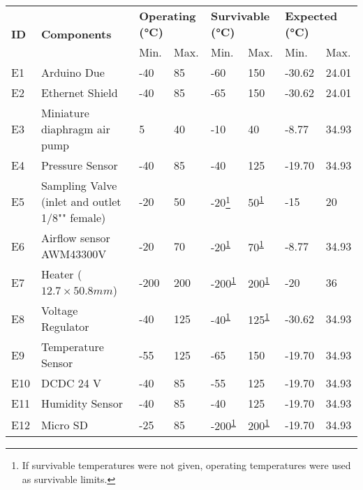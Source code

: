 



\begin{longtable}{|m{1cm}|m{3.5cm}|m{1.3cm}|m{1.3cm}|m{1.4cm}|m{1.3cm}|m{1.3cm}|m{1.3cm}|}
\hline
\multirow{2}{*}{\textbf{ID}} & \multirow{2}{*}{\textbf{Components}}                                 & \multicolumn{2}{l|}{\textbf{Operating (°C)}} & \multicolumn{2}{l|}{\textbf{Survivable (°C)}} & \multicolumn{2}{l|}{\textbf{Expected (°C)}} \\ \cline{3-8} &   & Min.  & Max.  & Min.  & Max.  &  Min.   &  Max.            \\ \hline
E1 & Arduino Due & -40 & 85 & -60 & 150 & -30.62 & 24.01 \\ \hline
E2 & Ethernet Shield & -40 & 85 & -65 & 150 & -30.62 & 24.01 \\ \hline
E3 & Miniature diaphragm air pump & 5 & 40 & -10 & 40 & -8.77 & 34.93 \\ \hline
E4 & Pressure Sensor & -40 & 85 & -40 & 125 & -19.70 & 34.93 \\ \hline
E5 & Sampling Valve (inlet and outlet 1/8"" female) & -20 & 50 & -20\footnote{If survivable temperatures were not given, operating temperatures were used as survivable limits.\label{fn:erik}} & 50\textsuperscript{\ref{fn:erik}} & -15 & 20 \\ \hline
E6 & Airflow sensor AWM43300V & -20 & 70 & -20\textsuperscript{\ref{fn:erik}} & 70\textsuperscript{\ref{fn:erik}} & -8.77 & 34.93 \\ \hline
E7 & Heater ($12.7\times 50.8 mm$) & -200 & 200 & -200\textsuperscript{\ref{fn:erik}} & 200\textsuperscript{\ref{fn:erik}} & -20 & 36 \\ \hline
E8 & Voltage Regulator & -40 & 125 & -40\textsuperscript{\ref{fn:erik}} & 125\textsuperscript{\ref{fn:erik}} & -30.62 & 34.93 \\ \hline
E9 & Temperature Sensor & -55 & 125 & -65 & 150 & -19.70 & 34.93 \\ \hline
E10 & DCDC 24 V & -40 & 85 & -55 & 125 & -19.70 & 34.93 \\ \hline
E11 & Humidity Sensor & -40 & 85 & -40 & 125 & -19.70 & 34.93 \\ \hline
E12 & Micro SD & -25 & 85 & -200\textsuperscript{\ref{fn:erik}} & 200\textsuperscript{\ref{fn:erik}} & -19.70 & 34.93 \\ \hline

\end{longtable}
